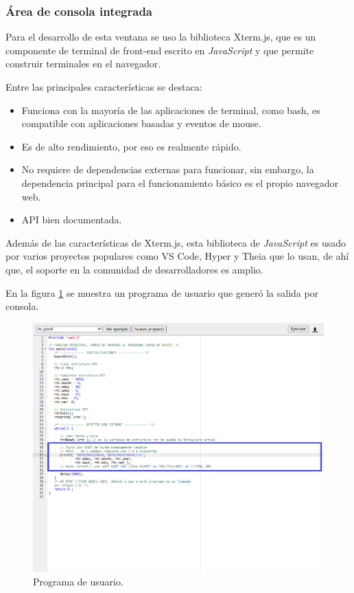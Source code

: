  
\subsubsection{Área de consola integrada}
Para el desarrollo de esta ventana se uso la biblioteca Xterm.js, que es un componente de terminal de front-end escrito en \textit{JavaScript} y que permite construir terminales en el navegador. 

Entre las principales características se destaca:

\begin{itemize}
	\item Funciona con la mayoría de las aplicaciones de terminal, como bash, es compatible con aplicaciones basadas y eventos de mouse.
	\item Es de alto rendimiento, por eso es realmente rápido.
	\item No requiere de dependencias externas para funcionar, sin embargo, la dependencia principal para el funcionamiento básico es el propio navegador web.
	\item API bien documentada.
\end{itemize}


Además de las características de Xterm.js, esta biblioteca de \textit{JavaScript} es usado por varios proyectos populares como VS Code, Hyper y Theia que lo usan, de ahí que, el soporte en la comunidad de desarrolladores es amplio.

En la figura \ref{fig:Terminal1} se muestra un programa de usuario que generó la salida por consola.

\begin{figure}[ht]
	\centering
	\includegraphics[scale=.41]{./Figures/Terminal1.png}
	\caption{Programa de usuario.}
	\label{fig:Terminal1}
\end{figure}
 



